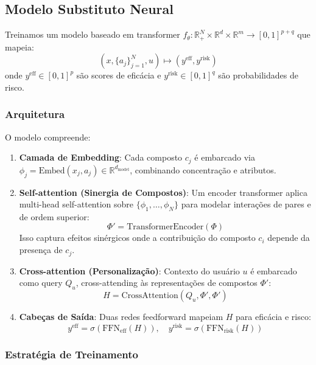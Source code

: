 \documentclass[11pt,a4paper]{article}
\begin{document}
\subsection{Modelo Substituto Neural}

Treinamos um modelo baseado em transformer \(f_\theta: \mathbb{R}_+^N \times \mathbb{R}^d \times \mathbb{R}^m \to [0,1]^{p+q}\) que mapeia:
\[
(x, \{a_j\}_{j=1}^N, u) \mapsto (y^{\text{eff}}, y^{\text{risk}})
\]
onde \(y^{\text{eff}} \in [0,1]^p\) são scores de eficácia e \(y^{\text{risk}} \in [0,1]^q\) são probabilidades de risco.

\subsubsection{Arquitetura}

O modelo compreende:
\begin{enumerate}
    \item \textbf{Camada de Embedding}: Cada composto \(c_j\) é embarcado via \(\phi_j = \text{Embed}(x_j, a_j) \in \mathbb{R}^{d_{\text{model}}}\), combinando concentração e atributos.
    
    \item \textbf{Self-attention (Sinergia de Compostos)}: Um encoder transformer aplica multi-head self-attention sobre \(\{\phi_1, \dots, \phi_N\}\) para modelar interações de pares e de ordem superior:
    \[
    \Phi' = \text{TransformerEncoder}(\Phi)
    \]
    Isso captura efeitos sinérgicos onde a contribuição do composto \(c_i\) depende da presença de \(c_j\).
    
    \item \textbf{Cross-attention (Personalização)}: Contexto do usuário \(u\) é embarcado como query \(Q_u\), cross-attending às representações de compostos \(\Phi'\):
    \[
    H = \text{CrossAttention}(Q_u, \Phi', \Phi')
    \]
    
    \item \textbf{Cabeças de Saída}: Duas redes feedforward mapeiam \(H\) para eficácia e risco:
    \[
    y^{\text{eff}} = \sigma(\text{FFN}_{\text{eff}}(H)), \quad y^{\text{risk}} = \sigma(\text{FFN}_{\text{risk}}(H))
    \]
\end{enumerate}

\subsubsection{Estratégia de Treinamento}
\end{document}
